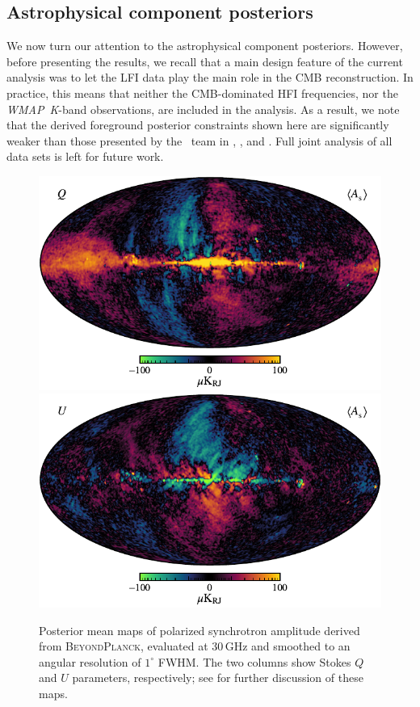 \documentclass[onecolumn]{aa}
\def\WMAP{\emph{WMAP}}
\newcommand{\BP}{\textsc{BeyondPlanck}}
\begin{document}
\subsection{Astrophysical component posteriors}
\label{sec:sky_params}

We now turn our attention to the astrophysical component posteriors. However,
before presenting the results, we recall that a main design feature of the
current analysis was to let the LFI data play the main role in the CMB
reconstruction. In practice, this means that neither the CMB-dominated HFI
frequencies, nor the \WMAP\ \emph K-band observations, are included in the
analysis. As a result, we note that the derived foreground posterior constraints
shown here are significantly weaker than those presented by the \Planck\ team in
\citet{planck2014-a12}, \citet{planck2016-l04}, and \citet{planck2020-LVII}. Full joint
analysis of all data sets is left for future work.

\begin{figure}[t]
  \center
  \includegraphics[width=0.49\linewidth]{figs/BP_synch_v2_Q_MEAN_w12_n1024_cb_c-wildfire.pdf}
  \includegraphics[width=0.49\linewidth]{figs/BP_synch_v2_U_MEAN_w12_n1024_cb_c-wildfire.pdf}
  \caption{Posterior mean maps of polarized synchrotron amplitude derived from \BP,
    evaluated at 30\,GHz and smoothed to an angular resolution of $1^{\circ}$ FWHM. The two columns show Stokes $Q$ and $U$ parameters, respectively; see \citet{bp14} for further discussion of these maps.}\label{fig:synch_pol}
\end{figure}
\end{document}
